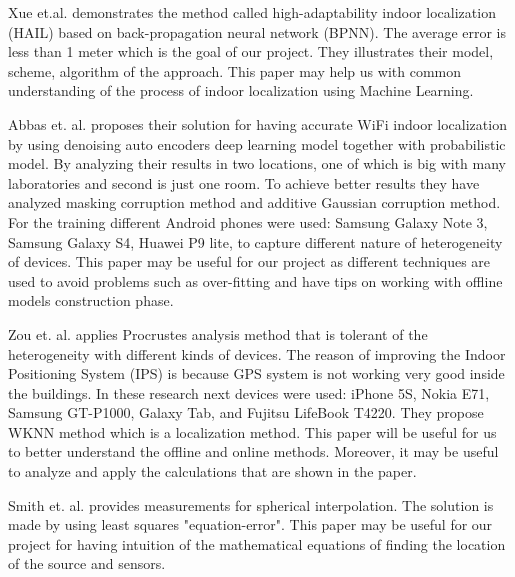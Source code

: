 \documentclass[]{final_report}
\begin{document}
Xue et.al. \cite{Jianzhe:2020} demonstrates the method called high-adaptability indoor localization (HAIL) based on back-propagation neural network (BPNN). The average error is less than 1 meter which is the goal of our project. They illustrates their model, scheme, algorithm of the approach. This paper may help us with common understanding of the process of indoor localization using Machine Learning. 


Abbas et. al. \cite{Abbas:2019} proposes their solution for having accurate WiFi indoor localization by using denoising auto encoders deep learning model together with probabilistic model. By analyzing their results in two locations, one of which is big with many laboratories and second is just one room. To achieve better results they have analyzed masking corruption method and additive Gaussian corruption method. For the training different Android phones were used: Samsung Galaxy Note 3, Samsung Galaxy S4, Huawei P9 lite, to capture different nature of heterogeneity of devices. This paper may be useful for our project as different techniques are used to avoid problems such as over-fitting and have tips on working with offline models construction phase.

Zou et. al. \cite{Zou:2016} applies Procrustes analysis method that is tolerant of the heterogeneity with different kinds of devices. The reason of improving the Indoor Positioning System (IPS) is because GPS system is not working very good inside the buildings. In these research next devices were used: iPhone 5S, Nokia E71, Samsung GT-P1000, Galaxy Tab, and Fujitsu LifeBook T4220. They propose WKNN method which is a localization method. This paper will be useful for us to better understand the offline and online methods. Moreover, it may be useful to analyze and apply the calculations that are shown in the paper.

Smith et. al. \cite{Smith:1987} provides measurements for spherical interpolation. The solution is made by using least squares "equation-error". This paper may be useful for our project for having intuition of the mathematical equations of finding the location of the source and sensors. 

\end{document}
